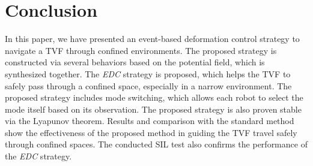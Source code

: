 \section{Conclusion}\label{sec5}
In this paper, we have presented an event-based deformation control strategy to navigate a TVF through confined environments. The proposed strategy is constructed via several behaviors based on the potential field, which is synthesized together. The \textit{EDC} strategy is proposed, which helps the TVF to safely pass through a confined space, especially in a narrow environment. The proposed strategy includes mode switching, which allows each robot to select the mode itself based on its observation. The proposed strategy is also proven stable via the Lyapunov theorem. Results and comparison with the standard method show the effectiveness of the proposed method in guiding the TVF travel safely through confined spaces. The conducted SIL test also confirms the performance of the \textit{EDC} strategy.
